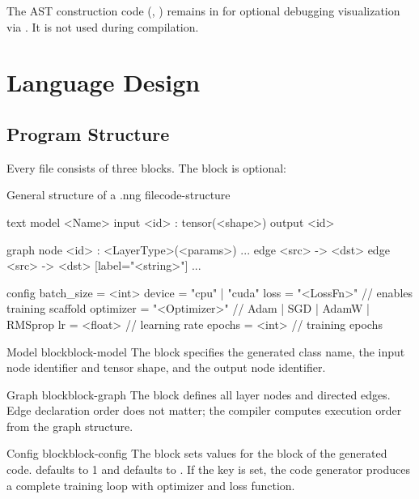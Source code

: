 \documentclass{nngraph-en}
\begin{document}
\begin{notebox}
The AST construction code (, )
remains in  for optional debugging
visualization via . It is not used during
compilation.
\end{notebox}

\chapter{Language Design}

\section{Program Structure}

Every  file consists of three blocks. The 
block is optional:

\begin{codebox}{General structure of a .nng file}{code-structure}
\begin{amzcode}{text}
model <Name> {
    input  <id> : tensor(<shape>)
    output <id>
}

graph {
    node <id> : <LayerType>(<params>)
    ...
    edge <src> -> <dst>
    edge <src> -> <dst> [label="<string>"]
    ...
}

config {
    batch_size = <int>
    device     = "cpu" | "cuda"
    loss       = "<LossFn>"       // enables training scaffold
    optimizer  = "<Optimizer>"    // Adam | SGD | AdamW | RMSprop
    lr         = <float>          // learning rate
    epochs     = <int>            // training epochs
}
\end{amzcode}
\end{codebox}

\begin{dfnbox}{Model block}{block-model}
The  block specifies the generated class name, the input
node identifier and tensor shape, and the output node identifier.
\end{dfnbox}

\begin{dfnbox}{Graph block}{block-graph}
The  block defines all layer nodes and directed edges.
Edge declaration order does not matter; the compiler computes
execution order from the graph structure.
\end{dfnbox}

\begin{dfnbox}{Config block}{block-config}
The  block sets values for the 
block of the generated code.  defaults to 1 and
 defaults to . If the  key is
set, the code generator produces a complete training loop with
optimizer and loss function.
\end{dfnbox}
\end{document}
